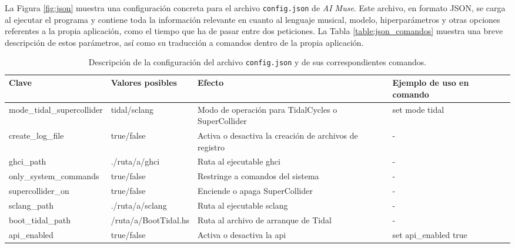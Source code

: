 La Figura \ref{fig:json} muestra una configuración concreta para el archivo \texttt{config.json} de \emph{AI Muse}. Este archivo, en formato JSON, se carga al ejecutar el programa y contiene toda la información relevante en cuanto al lenguaje musical, modelo, hiperparámetros y otras opciones referentes a la propia aplicación, como el tiempo que ha de pasar entre dos peticiones. La Tabla \ref{table:json_comandos} muestra una breve descripción de estos parámetros, así como su traducción a comandos dentro de la propia aplicación.




\begin{table}[htbp]
    \centering
    \caption[Descripción de la configuración del archivo \texttt{config.json} y de sus correspondientes comandos]{Descripción de la configuración del archivo \texttt{config.json} y de sus correspondientes comandos.}
    \label{tab:config-description}
    \fontsize{9.5pt}{11pt}\selectfont
    \begingroup
    \begin{tabularx}{\linewidth}{llXl}
        \toprule
        \rowcolor{azul_unir} %
        \textbf{Clave} & \textbf{Valores posibles} & \textbf{Efecto}& \textbf{Ejemplo de uso en comando} \\
        \midrule
    mode\_tidal\_supercollider & tidal/sclang & Modo de operación para TidalCycles o SuperCollider  & set mode tidal \\
    create\_log\_file & \textcolor{truecolor}{true}/\textcolor{falsecolor}{false} & Activa o desactiva la creación de archivos de registro  & - \\
    ghci\_path & \textcolor{pathcolor}{./ruta/a/ghci} & Ruta al ejecutable ghci  & - \\
    only\_system\_commands & \textcolor{truecolor}{true}/\textcolor{falsecolor}{false} & Restringe a comandos del sistema  & - \\
    supercollider\_on & \textcolor{truecolor}{true}/\textcolor{falsecolor}{false} & Enciende o apaga SuperCollider  & - \\
    sclang\_path & \textcolor{pathcolor}{./ruta/a/sclang} & Ruta al ejecutable sclang  & - \\
    boot\_tidal\_path & \textcolor{pathcolor}{/ruta/a/BootTidal.hs} & Ruta al archivo de arranque de Tidal  & - \\
    api\_enabled & \textcolor{truecolor}{true}/\textcolor{falsecolor}{false} & Activa o desactiva la \gls{api}  & set api\_enabled \textcolor{truecolor}{true} \\

\end{tabularx}
\end{table}
